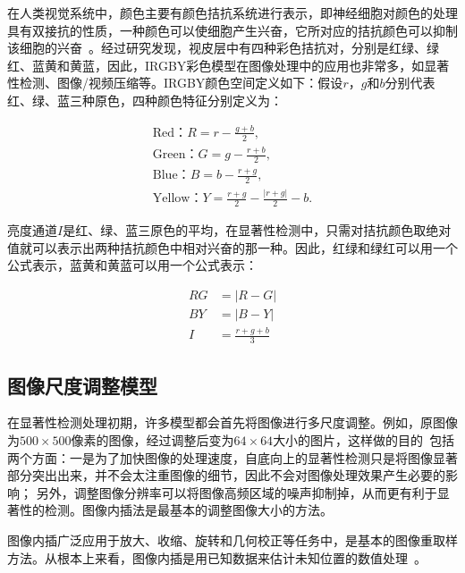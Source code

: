 在人类视觉系统中，颜色主要有颜色拮抗系统进行表示，即神经细胞对颜色的处理具有双接抗的性质，一种颜色可以使细胞产生兴奋，它所对应的拮抗颜色可以抑制该细胞的兴奋~\cite{Engel1997Colour}。经过研究发现，视皮层中有四种彩色拮抗对，分别是红绿、绿红、蓝黄和黄蓝，因此，IRGBY彩色模型在图像处理中的应用也非常多，如显著性检测、图像/视频压缩等。IRGBY颜色空间定义如下：假设$r$，$g$和$b$分别代表红、绿、蓝三种原色，四种颜色特征分别定义为：
\begin{linenomath}
\begin{align}
\textrm{Red：$R=r-\frac{g+b}{2}$,}\label{式2_6}\\
\textrm{Green：$G=g-\frac{r+b}{2}$,}\label{式2_7}\\
\textrm{Blue：$B=b-\frac{r+g}{2}$,}\label{式2_8}\\
\textrm{Yellow：$Y=\frac{r+g}{2}-\frac{|r+g|}{2}-b$.}\label{式2_9}
\end{align}
\end{linenomath}
亮度通道$I$是红、绿、蓝三原色的平均，在显著性检测中，只需对拮抗颜色取绝对值就可以表示出两种拮抗颜色中相对兴奋的那一种。因此，红绿和绿红可以用一个公式表示，蓝黄和黄蓝可以用一个公式表示：
\begin{linenomath}
\begin{align}
RG &= \big|R-G\big|\label{式2_10}\\
BY &= \big|B-Y\big|\label{式2_11}\\
I &= \frac{r+g+b}{3}\label{式2_12}
\end{align}
\end{linenomath}

\subsection{图像尺度调整模型}
\label{2_1_4}

在显著性检测处理初期，许多模型都会首先将图像进行多尺度调整。例如，原图像为$500×500$像素的图像，经过调整后变为$64×64$大小的图片，这样做的目的~\cite{ZhangLiming2010Book}包括两个方面：一是为了加快图像的处理速度，自底向上的显著性检测只是将图像显著部分突出出来，并不会太注重图像的细节，因此不会对图像处理效果产生必要的影响； 另外，调整图像分辨率可以将图像高频区域的噪声抑制掉，从而更有利于显著性的检测。图像内插法是最基本的调整图像大小的方法。

图像内插广泛应用于放大、收缩、旋转和几何校正等任务中，是基本的图像重取样方法。从根本上来看，图像内插是用已知数据来估计未知位置的数值处理~\cite{Gonzalez2005book}。

